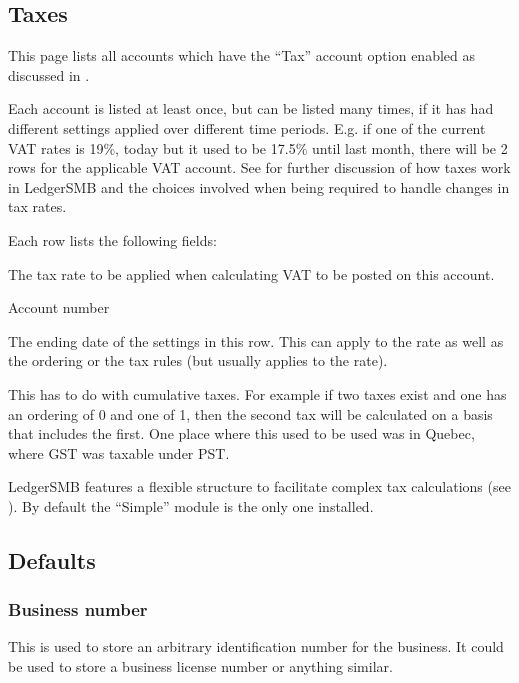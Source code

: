 \subsection{Taxes}
\label{subsec-company-config-taxes}


This page lists all accounts which have the ``Tax'' account option enabled as discussed in .

Each account is listed at least once, but can be listed many times, if it has had different
settings applied over different time periods. E.g. if one of the current VAT rates is 19\%,
today but it used to be 17.5\% until last month, there will be 2 rows for the applicable
VAT account. See  for further discussion of how taxes work in
LedgerSMB and the choices involved when being required to handle changes in tax rates.

Each row lists the following fields:

\begin{description}[style=nextline]
\item [Rate (\%)] The tax rate to be applied when calculating VAT to be posted on this account.
\item [Number] Account number
\item [Valid To] The ending date of the settings in this row. This can apply to the rate as well as the ordering or the tax rules (but usually applies to the rate).
\item [Ordering] This has to do with cumulative taxes.  For example if two taxes
exist and one has an ordering of 0 and one of 1, then the second tax will be
calculated on a basis that includes the first.  One place where this used to be
used was in Quebec, where GST was taxable under PST.
\item [Tax rules] LedgerSMB features a flexible structure to facilitate complex tax
calculations (see ). By default the ``Simple'' module
is the only one installed.
\end{description}

\subsection{Defaults}
\label{subsec-company-config-defaults}

\subsubsection{Business number}
\label{subsubsec-company-config-defaults-business-number}
   This is used to store an arbitrary identification number for the business.  It
could be used to store a business license number or anything similar.
   
